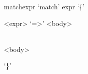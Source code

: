\documentclass[convert={outext=.png}]{standalone}
\begin{document}
\begin{málrit}{matchexpr}
	`match' expr `\{'
	\begin{repnull}
		<expr> `=>' <body>
	\end{repnull}
	\begin{stack}\\
		<body>
	\end{stack}
	`\}'
\end{málrit}
\end{document}
